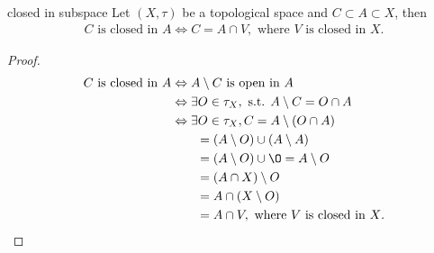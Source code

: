 \begin{proposition}{}{closed in subspace}
    Let $(X,\tau)$ be a topological space and $C\subset A\subset X$, then
    \begin{align*}
        C \text{ is closed in } A\Leftrightarrow C = A\cap V, \text{ where $V$ is closed in $X$}.  
    \end{align*}
\end{proposition}
\begin{proof}
         

    \begin{align*}
        C \text{ is closed in } A &\Leftrightarrow A\setminus C \text{ is open in } A\\
         &\Leftrightarrow \exists O\in \tau_{X}, \text{ s.t. } A\setminus C = O\cap A\\
         &\Leftrightarrow \exists O\in \tau_{X}, C= A\setminus(O\cap A) \\
         &\quad\quad = (A\setminus O) \cup (A\setminus A)\\
         &\quad\quad = (A\setminus O) \cup \O = A\setminus O\\
         &\quad\quad = (A\cap X)\setminus O\\
         &\quad\quad = A\cap (X\setminus O)\\
         &\quad\quad = A\cap V, \text{ where $V$ is closed in $X$.}
        \end{align*}
\end{proof}

